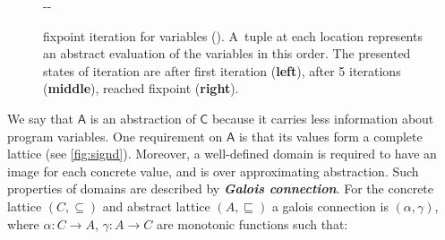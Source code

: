 \begin{figure}[!ht]
\begin{adjustwidth}{-\oddsidemargin-1in}{-\rightmargin}
\begin{minipage}[t]{0.3\textwidth +  0.3\marginparsep + 0.3\marginparwidth}
{
}
\end{minipage}
    \caption{ fixpoint iteration for variables
    (). A~tuple at each
    location represents an abstract evaluation of the variables in this order.
    The presented states of iteration are after first iteration
    (\textbf{left}), after 5 iterations (\textbf{middle}), reached fixpoint
    (\textbf{right}).}
    \label{fig:signcomp}%
    \end{adjustwidth}
\end{figure}%

We say that $\mathsf{A}$ is an abstraction of $\mathsf{C}$ because it carries
less information about program variables. One requirement on $\mathsf{A}$ is
that its values form a complete lattice (see \autoref{fig:signd}). Moreover, a
well-defined domain is required to have an image for each concrete value, and
 is over approximating abstraction. Such properties of domains are described by
 \textbf{\emph{Galois connection}}. For the concrete lattice $(C, \subseteq)$ and
 abstract lattice $(A, \sqsubseteq)$ a galois connection is $(\alpha, \gamma)$,
 where $\alpha : C \rightarrow A$, $\gamma : A \rightarrow C$ are monotonic
 functions such that:

